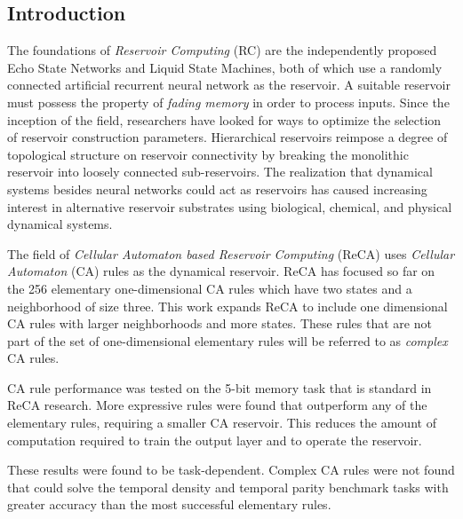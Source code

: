 \documentclass{elsarticle}
\begin{document}
\begin{multicols}{2}

\section{Introduction}\label{introduction}
 The foundations of \textit{Reservoir Computing} (RC) are the 
independently proposed Echo State Networks and Liquid State Machines, both of 
which use a randomly connected artificial recurrent neural network as the 
reservoir. A suitable reservoir  must possess the property of \textit{fading 
   memory} in order to process inputs. Since the inception of the field,  
   researchers have looked for ways to optimize the selection of reservoir 
      construction parameters. Hierarchical reservoirs reimpose a degree of 
      topological structure on reservoir connectivity by breaking the 
      monolithic reservoir into loosely connected sub-reservoirs. The 
      realization that dynamical systems besides neural networks could act as 
      reservoirs has caused increasing interest in alternative reservoir 
      substrates using biological, chemical, and physical dynamical systems.  
      \par
The field of \textit{Cellular Automaton based Reservoir Computing} (ReCA) uses 
\textit{Cellular Automaton} (CA) rules as the dynamical reservoir. ReCA has 
focused so far on the 256 elementary one-dimensional CA rules which have two 
states and a neighborhood of size three.  This work expands ReCA to include one 
dimensional CA rules with larger neighborhoods and more states.
    These rules that are not part of the set of one-dimensional elementary 
    rules will be referred to as \textit{complex} CA rules. \par CA rule 
    performance was tested on the 5-bit memory task that is standard in ReCA 
    research. More expressive rules were found that outperform any of the 
    elementary rules, requiring a smaller CA reservoir. This reduces the amount 
    of computation required to train the output layer and to operate the 
    reservoir. \par These results were found to be task-dependent. Complex CA 
    rules were not found that could solve the temporal density and temporal 
    parity benchmark tasks with greater accuracy than the most successful 
    elementary rules. \par

\end{multicols}
\end{document}
